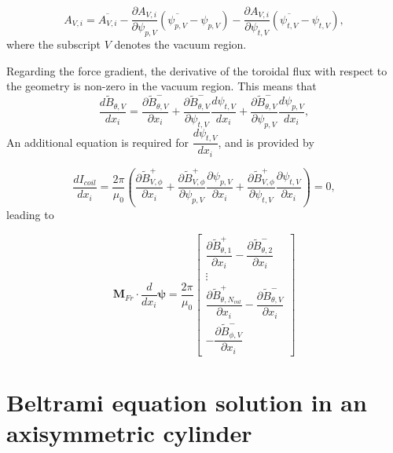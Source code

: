 \begin{equation}
	A_{V,i} = \overbar{A_{V,i}} - \frac{\partial {A_{V,i}}}{\partial {\psi_{p,V}}} (\overbar{\psi_{p,V}} - \psi_{p,V}) - \frac{\partial {A_{V,i}}}{\partial {\psi_{t,V}}} (\overbar{\psi_{t,V}} - \psi_{t,V}),
\end{equation}
where the subscript $V$ denotes the vacuum region.

Regarding the force gradient, the derivative of the toroidal flux with respect to the geometry is non-zero in the vacuum region. This means that
\begin{equation}
	\frac{d\tilde{B}_{\theta,V}}{dx_i} = \frac{\partial \tilde{B}^-_{\theta,V}}{\partial x_i} + \frac{\partial \tilde{B}^-_{\theta,V}}{\partial \psi_{t,V}}\frac{d \psi_{t,V}}{d x_i} + \frac{\partial \tilde{B}^-_{\theta,V}}{\partial \psi_{p,V}}\frac{d \psi_{p,V}}{d x_i},
\end{equation}
An additional equation is required for $\dfrac{d\psi_{t,V}}{dx_i}$, and is provided by

\begin{equation}
	\frac{dI_{coil}}{dx_i} = \frac{2\pi}{\mu_0}\left( \frac{\partial  \tilde{B}^+_{V,\phi}}{\partial x_i} + \frac{\partial  \tilde{B}^+_{V,\phi}}{\partial \psi_{p,V}}\frac{\partial\psi_{p,V}}{\partial x_i} +  \frac{\partial  \tilde{B}^+_{V,\phi}}{\partial \psi_{t,V}}\frac{\partial \psi_{t,V}}{\partial x_i} \right)   =0,
\end{equation}
leading to

\begin{equation}
	\mathbf{M}_{Fr} \cdot 
	\dfrac{d}{dx_i}\bm{\psi} = \frac{2\pi}{\mu_0} \begin{bmatrix}
		\dfrac{\partial \tilde{B}^+_{\theta,1}}{\partial x_i} - \dfrac{\partial \tilde{B}^-_{\theta,2}}{\partial x_i} \\
		\vdots \\
		\dfrac{\partial \tilde{B}^+_{\theta,N_{vol}} } {\partial x_i} - \dfrac{\partial \tilde{B}^-_{\theta,V}}{\partial x_i} \\
		-\dfrac{\partial\tilde{B}^-_{\phi,V}}{\partial x_i}
	\end{bmatrix}
\end{equation}



\chapter{Beltrami equation solution in an axisymmetric cylinder}\label{appB}

